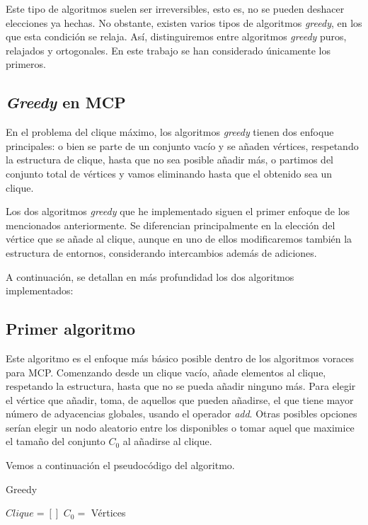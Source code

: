 Este tipo de algoritmos suelen ser irreversibles, esto es, no se pueden deshacer elecciones ya hechas.
No obstante, existen varios tipos de algoritmos \textit{greedy}, en los que esta condición se relaja. Así,
distinguiremos entre algoritmos \textit{greedy} puros, relajados y ortogonales. En este trabajo se han
considerado únicamente los primeros.

\subsection{\textit{Greedy} en MCP}

En el problema del clique máximo, los algoritmos \textit{greedy} tienen dos enfoque principales:
o bien se parte de un conjunto vacío y se añaden vértices, respetando la estructura de clique,
hasta que no sea posible añadir más, o partimos del conjunto total de vértices y vamos eliminando
hasta que el obtenido sea un clique.

Los dos algoritmos \textit{greedy} que he implementado siguen el primer enfoque de los mencionados anteriormente.
Se diferencian principalmente en la elección del vértice que se añade al clique, aunque en uno de ellos modificaremos
también la estructura de entornos, considerando intercambios además de adiciones.

A continuación, se detallan en más profundidad los dos algoritmos implementados:

\subsection{Primer algoritmo}

Este algoritmo es el enfoque más básico posible dentro de los algoritmos voraces para MCP.
Comenzando desde un clique vacío, añade elementos al clique, respetando la estructura, hasta
que no se pueda añadir ninguno más. Para elegir el vértice que añadir, toma, de aquellos que
pueden añadirse, el que tiene mayor número de adyacencias globales, usando el operador \textit{add}.
Otras posibles opciones serían elegir un nodo aleatorio entre los disponibles o tomar aquel que
maximice el tamaño del conjunto $C_0$ al añadirse al clique.

Vemos a continuación el pseudocódigo del algoritmo.

\begin{algorithm}[H]
\caption{Greedy}
  \begin{algorithmic}
  \State $Clique = [ ]$
  \State $C_0 = $ Vértices
  \Repeat
  \end{algorithmic}
\end{algorithm}


